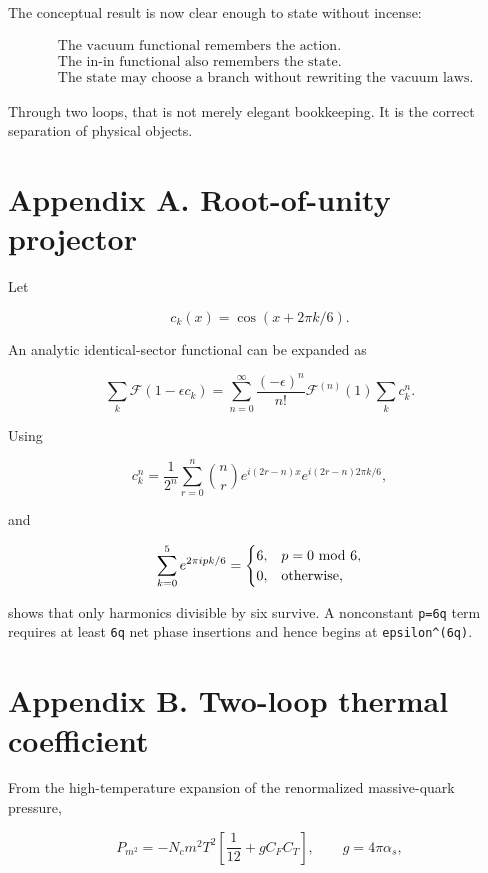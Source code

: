 \documentclass[
  10pt,
  a4paper,
]{article}
\begin{document}
The conceptual result is now clear enough to state without incense:

\[
\boxed{
\begin{aligned}
&\text{The vacuum functional remembers the action.}\\
&\text{The in-in functional also remembers the state.}\\
&\text{The state may choose a branch without rewriting the vacuum laws.}
\end{aligned}
}
\]

Through two loops, that is not merely elegant bookkeeping. It is the
correct separation of physical objects.

\section{Appendix A. Root-of-unity
projector}\label{appendix-a.-root-of-unity-projector}

Let

\[
c_k(x)=\cos(x+2\pi k/6).
\]

An analytic identical-sector functional can be expanded as

\[
\sum_k\mathcal F(1-\epsilon c_k)
=
\sum_{n=0}^\infty
\frac{(-\epsilon)^n}{n!}
\mathcal F^{(n)}(1)
\sum_k c_k^n.
\]

Using

\[
c_k^n
=
\frac1{2^n}
\sum_{r=0}^n
\binom nr
 e^{i(2r-n)x}
 e^{i(2r-n)2\pi k/6},
\]

and

\[
\sum_{k=0}^{5}e^{2\pi i pk/6}
=
\begin{cases}
6,&p=0\ {\rm mod}\ 6,\\
0,&\text{otherwise},
\end{cases}
\]

shows that only harmonics divisible by six survive. A nonconstant
\texttt{p=6q} term requires at least \texttt{6\textbar{}q\textbar{}} net
phase insertions and hence begins at
\texttt{epsilon\^{}(6\textbar{}q\textbar{})}.

\section{Appendix B. Two-loop thermal
coefficient}\label{appendix-b.-two-loop-thermal-coefficient}

From the high-temperature expansion of the renormalized massive-quark
pressure,

\[
P_{m^2}
=-N_cm^2T^2
\left[
\frac1{12}+g C_F C_T
\right],
\qquad
g=4\pi\alpha_s,
\]
\end{document}
